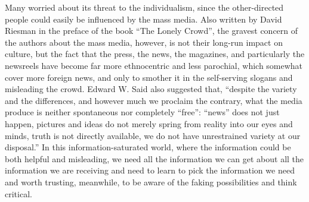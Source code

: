 Many worried about its threat to the individualism, since the other-directed people could easily be influenced by the mass media. Also written by David Riesman in the preface of the book ``The Lonely Crowd'', the gravest concern of the authors about the mass media, however, is not their long-run impact on culture, but the fact that the press, the news, the magazines, and particularly the newsreels have become far more ethnocentric and less parochial, which somewhat cover more foreign news, and only to smother it in the self-serving slogans and misleading the crowd. Edward W. Said also suggested that, ``despite the variety and the differences, and however much we proclaim the contrary, what the media produce is neither spontaneous nor completely ``free'': ``news'' does not just happen, pictures and ideas do not merely spring from reality into our eyes and minds, truth is not directly available, we do not have unrestrained variety at our disposal.'' In this information-saturated world, where the information could be both helpful and misleading, we need all the information we can get about all the information we are receiving and need to learn to pick the information we need and worth trusting, meanwhile, to be aware of the faking possibilities and think critical. 






 


			



